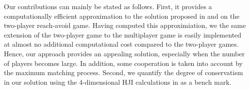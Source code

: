 Our contributions can mainly be stated as follows. First, it provides a computationally efficient approximation to the solution proposed in \cite{Huang2011} and \cite{Chen2014} on the two-player reach-avoid game. Having computed this approximiation, we the same extension of the two-player game to the multiplayer game is easily implemented at almost no additional computational cost compared to the two-player games. Hence, our approach provides an appealing solution, especially when the number of players becomes large. In addition, some cooperation is taken into account by the maximum matching process. Second, we quantify the degree of conservatism in our solution using the 4-dimensional HJI calculations in \cite{Chen2014} as a bench mark. 

